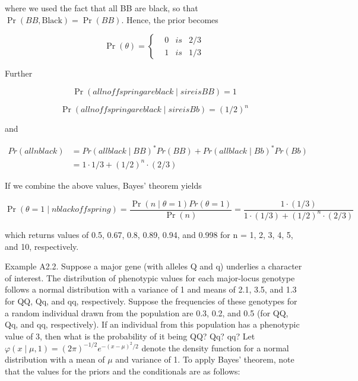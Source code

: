 \documentclass{article}
\begin{document}
where we used the fact that all BB are black, so that  $ \Pr(BB, \text{Black}) = \Pr(BB) $. Hence, the prior becomes

\begin{equation}
\Pr(\theta)=\left\{\begin{aligned}&0&is&2/3\\ &1&is&1/3\end{aligned}\right.
\end{equation}

Further

\begin{equation}
\Pr(all n offspring are black\mid sire is BB)=1
\end{equation}

\begin{equation}
\Pr(all n offspring are black\mid sire is Bb)=(1/2)^{n}
\end{equation}

and

\begin{equation}
\begin{aligned}Pr(all n black)&=Pr(all black\mid BB)^{*}Pr(BB)+Pr(all black\mid Bb)^{*}Pr(Bb)\\&=1\cdot1/3+(1/2)^{n}\cdot(2/3)\end{aligned}
\end{equation}

If we combine the above values, Bayes' theorem yields

\begin{equation}
\Pr(\theta=1\mid n black offspring)=\frac{\Pr(n\mid\theta=1)Pr(\theta=1)}{\Pr(n)}=\frac{1\cdot(1/3)}{1\cdot(1/3)+(1/2)^{n}\cdot(2/3)}
\end{equation}

which returns values of 0.5, 0.67, 0.8, 0.89, 0.94, and 0.998 for n = 1, 2, 3, 4, 5, and 10, respectively.

Example A2.2. Suppose a major gene (with alleles Q and q) underlies a character of interest. The distribution of phenotypic values for each major-locus genotype follows a normal distribution with a variance of 1 and means of 2.1, 3.5, and 1.3 for QQ, Qq, and qq, respectively. Suppose the frequencies of these genotypes for a random individual drawn from the population are 0.3, 0.2, and 0.5 (for QQ, Qq, and qq, respectively). If an individual from this population has a phenotypic value of 3, then what is the probability of it being QQ? Qq? qq? Let  $ \varphi(x \mid \mu, 1) = (2\pi)^{-1/2} e^{-(x-\mu)^2 / 2} $ denote the density function for a normal distribution with a mean of  $ \mu $ and variance of 1. To apply Bayes' theorem, note that the values for the priors and the conditionals are as follows:
\end{document}
